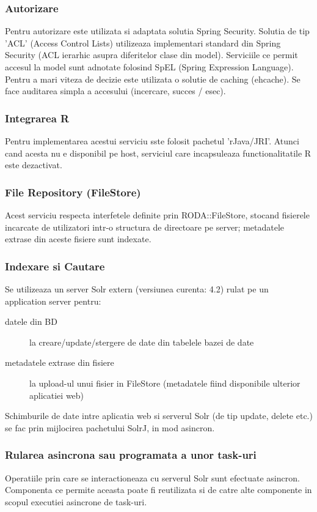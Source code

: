 \subsubsection{Autorizare}
Pentru autorizare este utilizata si adaptata solutia Spring Security.
Solutia de tip 'ACL' (Access Control Lists) utilizeaza implementari standard din
Spring Security (ACL ierarhic asupra diferitelor clase din model). 
Serviciile ce permit accesul la model sunt adnotate folosind SpEL
(Spring Expression Language).
Pentru a mari viteza de decizie este utilizata o solutie de caching (ehcache). 
Se face auditarea simpla a accesului (incercare, succes / esec). 

\subsubsection{Integrarea R}
Pentru implementarea acestui serviciu sste folosit pachetul 'rJava/JRI'. 
Atunci cand acesta nu e disponibil pe host, serviciul care
incapsuleaza functionalitatile R este dezactivat.

\subsubsection{File Repository (FileStore)}
Acest serviciu respecta interfetele definite prin RODA::FileStore, stocand
fisierele incarcate de utilizatori intr-o structura de directoare pe server;
metadatele extrase din aceste fisiere sunt indexate.

\subsubsection{Indexare si Cautare}
Se utilizeaza un server Solr extern (versiunea curenta: 4.2) rulat pe un
application server pentru:
\begin{description}
\item[datele din BD] la creare/update/stergere de date din tabelele bazei de
date
\item[metadatele extrase din fisiere] la upload-ul unui fisier
in FileStore (metadatele fiind disponibile ulterior aplicatiei web)
\end{description}

Schimburile de date intre aplicatia web si serverul Solr (de tip update, delete
etc.) se fac prin mijlocirea pachetului SolrJ, in mod asincron.

\subsubsection{Rularea asincrona sau programata a unor task-uri}
Operatiile prin care se interactioneaza cu serverul Solr sunt efectuate
asincron. Componenta ce permite aceasta poate fi reutilizata si de catre alte
componente in scopul executiei asincrone de task-uri.

